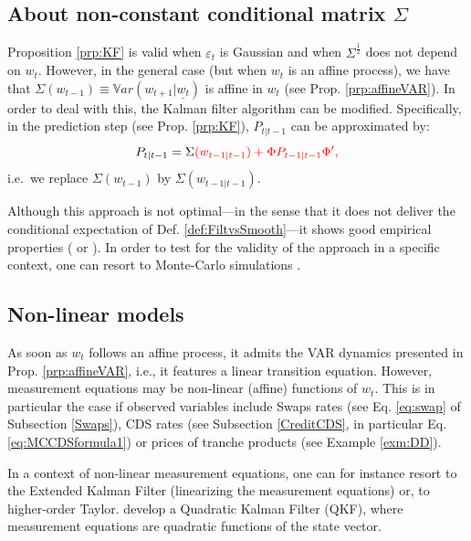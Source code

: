 \documentclass[
  12pt,
]{book}
\theoremstyle{definition}
\theoremstyle{definition}
\theoremstyle{definition}
\theoremstyle{definition}
\theoremstyle{remark}
\begin{document}
\hypertarget{about-non-constant-conditional-matrix-sigma}{%
\subsection{\texorpdfstring{About non-constant conditional matrix \(\Sigma\)}{About non-constant conditional matrix \textbackslash Sigma}}\label{about-non-constant-conditional-matrix-sigma}}

Proposition \ref{prp:KF} is valid when \(\varepsilon_t\) is Gaussian and when \(\Sigma^{\frac{1}{2}}\) does not depend on \(w_t\). However, in the general case (but when \(w_t\) is an affine process), we have that \(\Sigma(w_{t-1}) \equiv \mathbb{V}ar(w_{t+1}|\underline{w_t})\) is affine in \(w_t\) (see Prop. \ref{prp:affineVAR}). In order to deal with this, the Kalman filter algorithm can be modified. Specifically, in the prediction step (see Prop. \ref{prp:KF}), \(P_{t|t-1}\) can be approximated by:
\[
P_{t|t-1} = \Sigma\color{red}{(w_{t-1|t-1})} + \Phi P_{t-1|t-1} \Phi',
\]
i.e.~we replace \(\Sigma(w_{t-1})\) by \(\Sigma(w_{t-1|t-1})\).

Although this approach is not optimal---in the sense that it does not deliver the conditional expectation of Def. \ref{def:FiltvsSmooth}---it shows good empirical properties (\citet{deJong_2000} or \citet{Duan_Simonato_1999}). In order to test for the validity of the approach in a specific context, one can resort to Monte-Carlo simulations \citep{zarg_2017}.

\hypertarget{nonlinear}{%
\subsection{Non-linear models}\label{nonlinear}}

As soon as \(w_t\) follows an affine process, it admits the VAR dynamics presented in Prop. \ref{prp:affineVAR}, i.e., it features a linear transition equation. However, measurement equations may be non-linear (affine) functions of \(w_t\). This is in particular the case if observed variables include Swaps rates (see Eq. \eqref{eq:swap} of Subsection \ref{Swaps}), CDS rates (see Subsection \ref{CreditCDS}, in particular Eq. \eqref{eq:MCCDSformula1}) or prices of tranche products (see Example \ref{exm:DD}).

In a context of non-linear measurement equations, one can for instance resort to the Extended Kalman Filter (linearizing the measurement equations) or, to higher-order Taylor. \citet{Monfort_Renne_Roussellet_2015} develop a Quadratic Kalman Filter (QKF), where measurement equations are quadratic functions of the state vector.
\end{document}
